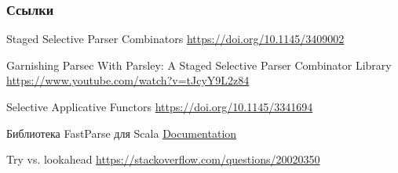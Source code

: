 \documentclass[aspectratio=169
  , xcolor={svgnames}
  , hyperref={ colorlinks,citecolor=Blue
             , linkcolor=DarkRed,urlcolor=DarkBlue}
  , usenames, dvipsnames
  , russian
  ]{beamer}
\begin{document}
\begin{frame}[allowframebreaks]
\frametitle<presentation>{Ссылки}
\begin{thebibliography}{10}

    Staged Selective Parser Combinators
    \newblock \url{https://doi.org/10.1145/3409002}

    Garnishing Parsec With Parsley: A Staged Selective Parser Combinator Library
    \newblock \url{https://www.youtube.com/watch?v=tJcyY9L2z84}


     Selective Applicative Functors
    \newblock \url{https://doi.org/10.1145/3341694}
 
    Библиотека FastParse для Scala
    \newblock \href{https://webcache.googleusercontent.com/search?q=cache:WSoAEDqEOakJ:https://www.lihaoyi.com/fastparse/}{Documentation}
   
    Try vs. lookahead
    \newblock \url{https://stackoverflow.com/questions/20020350}
    
%
%
%
    
\end{thebibliography}
 \end{frame}
\end{document}
